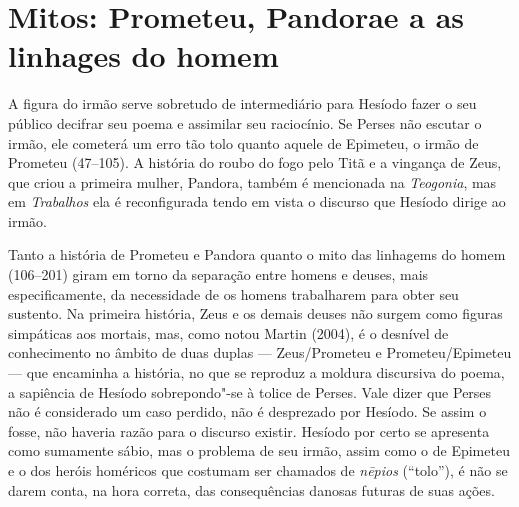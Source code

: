 
\section[Mitos: Prometeu, Pandora e a as linhages do homem]{Mitos: Prometeu, Pandora\break e a as linhages do homem}

A figura do irmão serve sobretudo de intermediário para Hesíodo
fazer o seu público decifrar seu poema e assimilar seu raciocínio. Se
Perses não escutar o irmão, ele cometerá um erro tão tolo quanto aquele
de Epimeteu, o irmão de Prometeu (47--105). A história do roubo do fogo
pelo Titã e a vingança de Zeus, que criou a primeira mulher, Pandora,
também é mencionada na \emph{Teogonia}, mas em \emph{Trabalhos} ela é
reconfigurada tendo em vista o discurso que Hesíodo dirige ao irmão.

Tanto a história de Prometeu e Pandora quanto o mito das linhagems do
homem (106--201) giram em torno da separação entre homens e deuses, mais
especificamente, da necessidade de os homens trabalharem para obter seu
sustento. Na primeira história, Zeus e os demais deuses não surgem como
figuras simpáticas aos mortais, mas, como notou Martin (2004), é o
desnível de conhecimento no âmbito de duas duplas --- Zeus/Prometeu e
Prometeu/Epimeteu --- que encaminha a história, no que se reproduz a
moldura discursiva do poema, a sapiência de Hesíodo sobrepondo"-se à
tolice de Perses. Vale dizer que Perses não é considerado um caso
perdido, não é desprezado por Hesíodo. Se assim o fosse, não haveria
razão para o discurso existir. Hesíodo por certo se apresenta como
sumamente sábio, mas o problema de seu irmão, assim como o de Epimeteu e
o dos heróis homéricos que costumam ser chamados de \emph{nēpios}
(``tolo''), é não se darem conta, na hora correta, das consequências
danosas futuras de suas ações.

